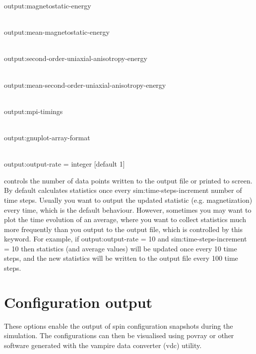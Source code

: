 {\zicf output:magnetostatic-energy}\\

{\zicf output:mean-magnetostatic-energy}\\

{\zicf output:second-order-uniaxial-anisotropy-energy}\\

{\zicf output:mean-second-order-uniaxial-anisotropy-energy}\\

{\zicf output:mpi-timings}\\

{\zicf output:gnuplot-array-format}\\

{\zicf output:output-rate = integer [default 1]} controls the number of data points written to the output file or printed to screen. By default \vampire calculates statistics once every sim:time-steps-increment number of time steps. Usually you want to output the updated statistic (e.g. magnetization) every time, which is the default behaviour. However, sometimes you may want to plot the time evolution of an average, where you want to collect statistics much more frequently than you output to the output file, which is controlled by this keyword. For example, if output:output-rate = 10 and sim:time-steps-increment = 10 then statistics (and average values) will be updated once every 10 time steps, and the new statistics will be written to the output file every 100 time steps.\\

\section*{Configuration output}
These options enable the output of spin configuration snapshots during the
simulation. The configurations can then be visualised using povray or other
software generated with the vampire data converter (vdc) utility.\\

